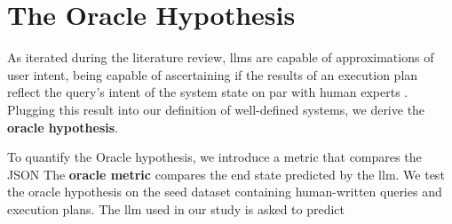 \section{The Oracle Hypothesis}

As iterated during the literature review, \glspl{llm} are capable of approximations of user intent, being capable of ascertaining if the results of an execution plan reflect the query's intent of the system state on par with human experts \cite{zheng2023judgingllmasajudgemtbenchchatbot} \cite{qin2023toolllmfacilitatinglargelanguage}. Plugging this result into our definition of well-defined systems, we derive the \textbf{oracle hypothesis}.

\vskip 0.2in

{
\centering
{}
}

\vskip 0.2in

To quantify the Oracle hypothesis, we introduce a metric that compares the JSON 
The \textbf{oracle metric} compares the end state predicted by the \gls{llm}. We test the oracle hypothesis on the seed dataset containing human-written queries and execution plans. The \gls{llm} used in our study is asked to predict 